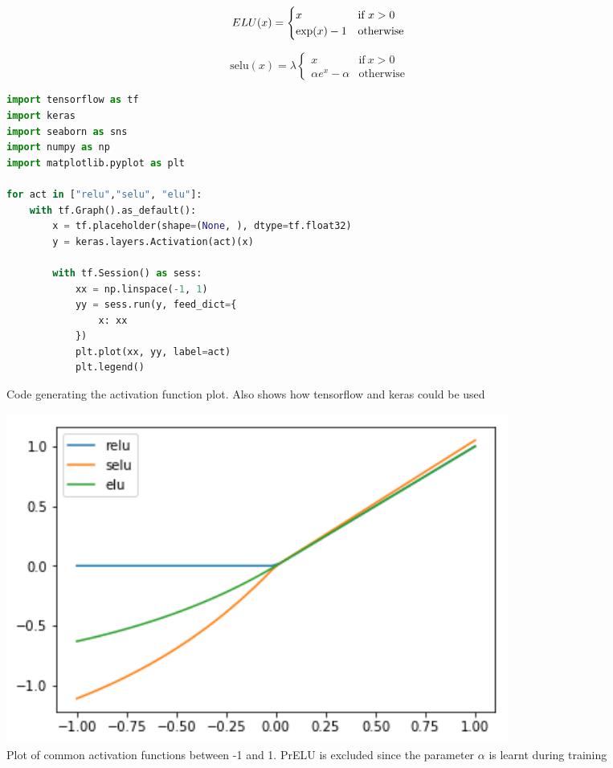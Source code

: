 \documentclass[times, utf8, diplomski, english]{fer}
\begin{document}
\begin{equation}
\label{eq:elu}
ELU(x)=
\begin{cases}
x & \text{if}\ x>0 \\
\exp(x) - 1 & \text{otherwise}
\end{cases}    \\
\end{equation}

\begin{equation}
\label{eq:selu}
\text{selu}(x)= \lambda
\begin{cases}
x & \text{if}\ x>0 \\
\alpha e^x - \alpha & \text{otherwise}
\end{cases} 
\end{equation}

\begin{figure}
\begin{lstlisting}[language=python,style=protobuf]
import tensorflow as tf
import keras
import seaborn as sns
import numpy as np
import matplotlib.pyplot as plt

for act in ["relu","selu", "elu"]:
    with tf.Graph().as_default():
        x = tf.placeholder(shape=(None, ), dtype=tf.float32)
        y = keras.layers.Activation(act)(x) 

        with tf.Session() as sess:
            xx = np.linspace(-1, 1)
            yy = sess.run(y, feed_dict={
                x: xx
            })
            plt.plot(xx, yy, label=act)
            plt.legend()
\end{lstlisting}
\caption{Code generating the activation function plot. Also shows how tensorflow and keras could be used}
\label{fg:actcode}
\end{figure}

\begin{figure}
    \begin{center}
        \includegraphics[width=0.8\textwidth]{act_plot}
        \caption{Plot of common activation functions between -1 and 1. PrELU is excluded since the parameter $\alpha$ is learnt during training}
        \label{fg:act_plot}
    \end{center}
\end{figure}
\end{document}
